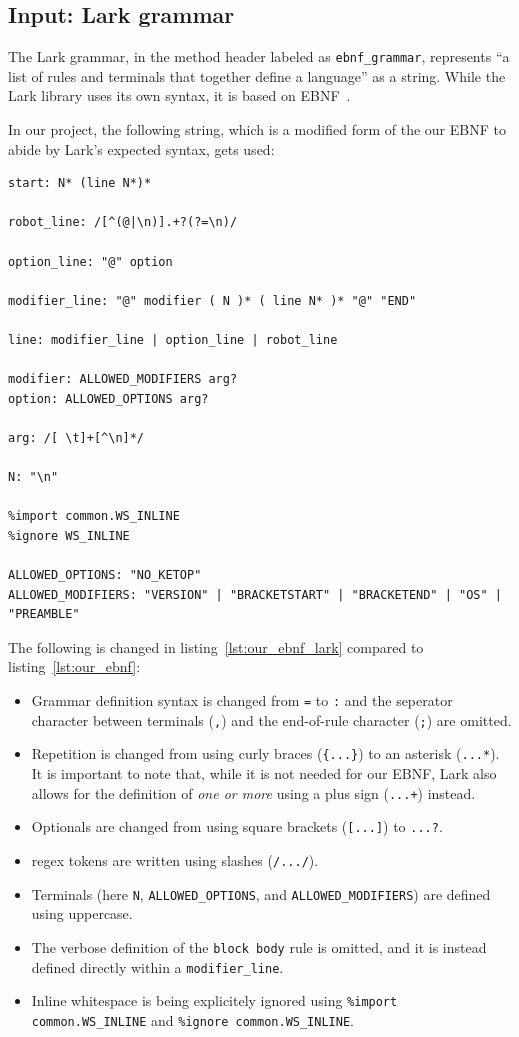 \subsection{Input: Lark grammar}

The Lark grammar, in the method header labeled as \verb|ebnf_grammar|, represents ``a list of rules and terminals that together define a language''\cite{py-module-lark-grammar} as a string. While the Lark library uses its own syntax, it is based on EBNF~\cite{py-module-lark-grammar}.

In our project, the following string, which is a modified form of the our EBNF to abide by Lark's expected syntax, gets used:

\begin{lstlisting}[caption={Our EBNF defined using Lark's syntax.}, label={lst:our_ebnf_lark}]
start: N* (line N*)*

robot_line: /[^(@|\n)].+?(?=\n)/

option_line: "@" option 

modifier_line: "@" modifier ( N )* ( line N* )* "@" "END"

line: modifier_line | option_line | robot_line

modifier: ALLOWED_MODIFIERS arg?
option: ALLOWED_OPTIONS arg?

arg: /[ \t]+[^\n]*/

N: "\n"

%import common.WS_INLINE
%ignore WS_INLINE

ALLOWED_OPTIONS: "NO_KETOP" 
ALLOWED_MODIFIERS: "VERSION" | "BRACKETSTART" | "BRACKETEND" | "OS" | "PREAMBLE"
\end{lstlisting}

The following is changed in listing~\ref{lst:our_ebnf_lark} compared to listing~\ref{lst:our_ebnf}:
\begin{itemize}
    \item Grammar definition syntax is changed from \verb|=| to \verb|:| and the seperator character between terminals (\verb|,|) and the end-of-rule character (\verb|;|) are omitted.
    \item Repetition is changed from using curly braces (\verb|{...}|) to an asterisk (\verb|...*|). It is important to note that, while it is not needed for our EBNF, Lark also allows for the definition of \textit{one or more} using a plus sign (\verb|...+|) instead.
    \item Optionals are changed from using square brackets (\verb|[...]|) to \verb|...?|.
    \item \gls{regex} tokens are written using slashes (\verb|/.../|).
    \item Terminals (here \verb|N|, \verb|ALLOWED_OPTIONS|, and \verb|ALLOWED_MODIFIERS|) are defined using uppercase.
    \item The verbose definition of the \verb|block body| rule is omitted, and it is instead defined directly within a \verb|modifier_line|.
    \item Inline whitespace is being explicitely ignored using \verb|%import common.WS_INLINE| and \verb|%ignore common.WS_INLINE|. %
\end{itemize}

